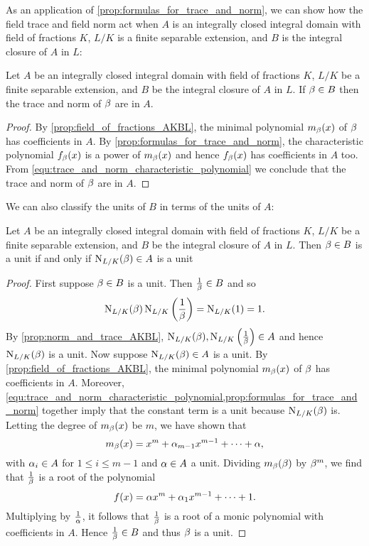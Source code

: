     As an application of \cref{prop:formulas_for_trace_and_norm}, we can show how the field trace and field norm act when $A$ is an integrally closed integral domain with field of fractions $K$, $L/K$ is a finite separable extension, and $B$ is the integral closure of $A$ in $L$:

    \begin{proposition}\label{prop:norm_and_trace_AKBL}
      Let $A$ be an integrally closed integral domain with field of fractions $K$, $L/K$ be a finite separable extension, and $B$ be the integral closure of $A$ in $L$. If $\beta \in B$ then the trace and norm of $\beta$ are in $A$.
    \end{proposition}
    \begin{proof}
      By \cref{prop:field_of_fractions_AKBL}, the minimal polynomial $m_{\beta}(x)$ of $\beta$ has coefficients in $A$. By \cref{prop:formulas_for_trace_and_norm}, the characteristic polynomial $f_{\beta}(x)$ is a power of $m_{\beta}(x)$ and hence $f_{\beta}(x)$ has coefficients in $A$ too. From \cref{equ:trace_and_norm_characteristic_polynomial} we conclude that the trace and norm of $\beta$ are in $A$.
    \end{proof}

    We can also classify the units of $B$ in terms of the units of $A$:

    \begin{proposition}\label{prop:unit_if_and_only_if_AKBL}
      Let $A$ be an integrally closed integral domain with field of fractions $K$, $L/K$ be a finite separable extension, and $B$ be the integral closure of $A$ in $L$. Then $\beta \in B$ is a unit if and only if $\operatorname{\mathrm{N}}_{L/K}(\beta) \in A$ is a unit
    \end{proposition}
    \begin{proof}
      First suppose $\beta \in B$ is a unit. Then $\frac{1}{\beta} \in B$ and so
      \[
        \operatorname{\mathrm{N}}_{L/K}(\beta)\operatorname{\mathrm{N}}_{L/K}\left(\frac{1}{\beta}\right) = \operatorname{\mathrm{N}}_{L/K}(1) = 1.
      \]
      By \cref{prop:norm_and_trace_AKBL}, $\operatorname{\mathrm{N}}_{L/K}(\beta),\operatorname{\mathrm{N}}_{L/K}\left(\frac{1}{\beta}\right) \in A$ and hence $\operatorname{\mathrm{N}}_{L/K}(\beta)$ is a unit. Now suppose $\operatorname{\mathrm{N}}_{L/K}(\beta) \in A$ is a unit. By \cref{prop:field_of_fractions_AKBL}, the minimal polynomial $m_{\beta}(x)$ of $\beta$ has coefficients in $A$. Moreover, \cref{equ:trace_and_norm_characteristic_polynomial,prop:formulas_for_trace_and_norm} together imply that the constant term is a unit because $\operatorname{\mathrm{N}}_{L/K}(\beta)$ is. Letting the degree of $m_{\beta}(x)$ be $m$, we have shown that
      \[
        m_{\beta}(x) = x^{m}+\alpha_{m-1}x^{m-1}+\cdots+\alpha,
      \]
      with $\alpha_{i} \in A$ for $1 \le i \le m-1$ and $\alpha \in A$ a unit. Dividing $m_{\beta}(\beta)$ by $\beta^{m}$, we find that $\frac{1}{\beta}$ is a root of the polynomial
      \[
        f(x) = \alpha x^{m}+\alpha_{1}x^{m-1}+\cdots+1.
      \]
      Multiplying by $\frac{1}{\alpha}$, it follows that $\frac{1}{\beta}$ is a root of a monic polynomial with coefficients in $A$. Hence $\frac{1}{\beta} \in B$ and thus $\beta$ is a unit.
    \end{proof}

